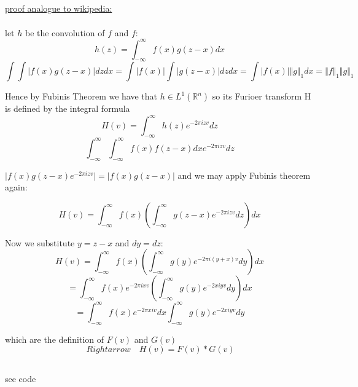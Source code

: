 \documentclass[12pt]{article}
\newcommand{\R}{\mathbb{R}}
\newcommand{\intinfty}{\int^{\infty}_{-\infty}}
\begin{document}

\setcounter{section}{9}
\setcounter{subsection}{0}


\subsection{ }


\subsection{ }

\underline{proof analogue to wikipedia:}\\\\

let $h$ be the convolution of $f$ and $f$:
$$ h(z) = \int^\infty_{-\infty} f(x)g(z-x) dx$$
$$\int \int \vert f(x)g(z-x) \vert dz dx = \int \vert f(x) \vert \int \vert g(z-x) \vert dz dx = \int \vert f(x) \vert \Vert g \Vert_1 dx = \Vert f \Vert_1 \Vert g \Vert_1$$

Hence by Fubinis Theorem we have that $h \in L^1(\R^n)$ so its Furioer transform H is defined by the integral formula
$$H(v) = \int^\infty_{-\infty} h(z)e^{-2 \pi i z v} dz$$
$$ \int^\infty_{-\infty} \int^\infty_{-\infty} f(x) f(z-x) dx e^{-2 \pi i z v} dz$$

$\vert f(x) g(z-x) e^{-2 \pi i z v} \vert = \vert f(x) g(z-x) \vert$ and we may apply Fubinis theorem again:

$$ H(v) = \int^\infty_{-\infty} f(x) (\int^\infty_{-\infty} g(z-x)e^{-2 \pi i z v} dz) dx$$

Now we substitute $y = z - x$ and $dy = dz$:
$$ H(v) = \intinfty f(x) ( \intinfty g(y)e^{-2 \pi i (y + x) v}dy)dx$$
$$ = \intinfty f(x) e ^{-2 \pi i x v} (\intinfty g(y) e ^{-2 x i y v}dy)dx$$
$$ = \intinfty f(x) e ^{-2 \pi x i v} dx \intinfty g(y)e^{-2 x i y v} dy$$

which are the definition of $F(v)$ and $G(v)$
$$ \ Rightarrow \quad H(v) = F(v) * G(v) $$




\subsection{ }



\subsection{ }
see code


\subsection{ }


\subsection{ }
\end{document}
